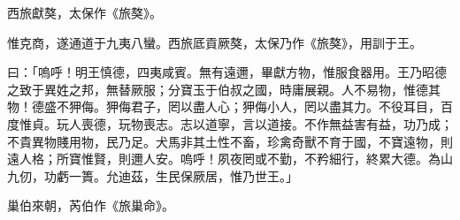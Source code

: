 
\begin{pinyinscope}
西旅獻獒，太保作《旅獒》。

惟克商，遂通道于九夷八蠻。西旅厎貢厥獒，太保乃作《旅獒》，用訓于王。

曰：「嗚呼！明王慎德，四夷咸賓。無有遠邇，畢獻方物，惟服食器用。王乃昭德之致于異姓之邦，無替厥服；分寶玉于伯叔之國，時庸展親。人不易物，惟德其物！德盛不狎侮。狎侮君子，罔以盡人心；狎侮小人，罔以盡其力。不役耳目，百度惟貞。玩人喪德，玩物喪志。志以道寧，言以道接。不作無益害有益，功乃成；不貴異物賤用物，民乃足。犬馬非其土性不畜，珍禽奇獸不育于國，不寶遠物，則遠人格；所寶惟賢，則邇人安。嗚呼！夙夜罔或不勤，不矜細行，終累大德。為山九仞，功虧一簣。允迪茲，生民保厥居，惟乃世王。」

巢伯來朝，芮伯作《旅巢命》。


\end{pinyinscope}